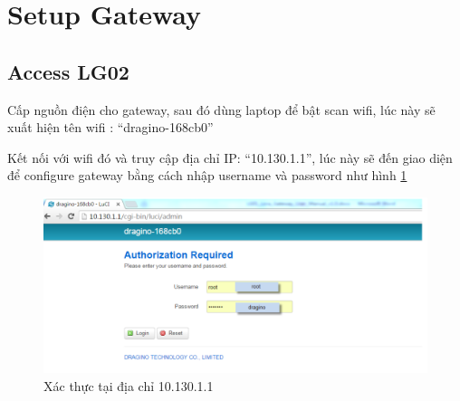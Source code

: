 \section{Setup Gateway}
\subsection{Access LG02}
Cấp nguồn điện cho gateway, sau đó dùng laptop để bật scan wifi, lúc này sẽ xuất hiện tên wifi : “dragino-168cb0”

Kết nối với wifi đó và truy cập địa chỉ IP: “10.130.1.1”, lúc này sẽ đến giao diện để configure gateway bằng cách nhập username và password như hình \ref{fig:gateway_configure}
\begin{figure}[H]
    \includegraphics[width=\textwidth]{images/Quanh/Gateway_configure.png}
    \caption{Xác thực tại địa chỉ 10.130.1.1}
    \label{fig:gateway_configure}
\end{figure}

